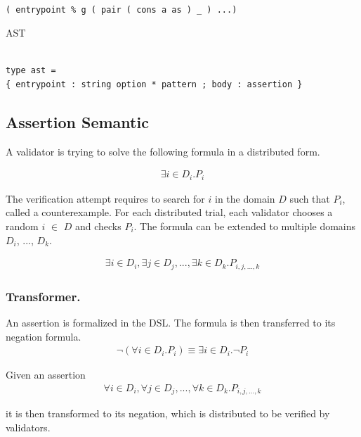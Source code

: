 \documentclass[runningheads]{llncs}
\begin{document}
\begin{lstlisting}[numbers=none]

( entrypoint % g ( pair ( cons a as ) _ ) ...)
\end{lstlisting}

AST

\begin{lstlisting}[numbers=none]

type ast =
{ entrypoint : string option * pattern ; body : assertion }

\end{lstlisting}

\subsection{Assertion Semantic}
A validator is trying to solve the following formula in a distributed form.

\begin{gather}
  \label{eq:2}
  \exists i \in D_{i}. P_{i}
\end{gather}

\noindent The verification attempt requires to search for $i$ in the domain $D$ such that $P_{i}$, called a counterexample. For each distributed trial, each validator chooses a random $i$ $\in$ $D$ and checks $P_{i}$. The formula can be extended to multiple domains $D_{i}$, ..., $D_{k}$.

\begin{gather}
  \label{eq:2}
\exists i \in D_{i}, \exists j \in D_{j}, ..., \exists k \in D_{k}. P_{i, j, ...,k}
\end{gather}

\subsubsection{Transformer. }
An assertion is formalized in the DSL. The formula is then transferred to its negation formula. 
\begin{gather}
  \label{eq:2}
\neg (\forall i \in D_{i}. P_{i}) \equiv \exists i \in D_{i}. \neg P_{i}
\end{gather}

\noindent Given an assertion
\begin{gather}
  \label{eq:2}
\forall i \in D_{i},  \forall j \in D_{j},  ..., \forall k \in D_{k}. P_{i, j, ...,k}
\end{gather}

\noindent it is then transformed to its negation, which is distributed to be verified by validators.
\end{document}
